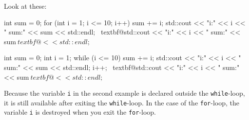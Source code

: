 Look at these:
\begin{console}[commandchars=\~\@\$]
int sum = 0;
for (int i = 1; i <= 10; i++)
{   
    sum += i;
    std::cout << "i:" << i << " sum:" << sum
              << std::endl;
}
~textbf@std::cout << "i:" << i << " sum:" << sum$
          ~textbf@<< std::endl;$
\end{console}
\begin{console}[commandchars=\~\@\$]
int sum = 0;
int i = 1;
while (i <= 10)
{     
      sum += i;
      std::cout << "i:" << i << " sum:" << sum <<
      std::endl;
      i++;
}
~textbf@std::cout << "i:" << i << " sum:" << sum$
          ~textbf@<< std::endl;$
\end{console}
Because the variable \texttt{i} in the second example is declared outside
the \texttt{while}-loop, it is still available after exiting the
\texttt{while}-loop. In the case of the \texttt{for}-loop, the variable
\texttt{i} is destroyed when you exit the \texttt{for}-loop.

